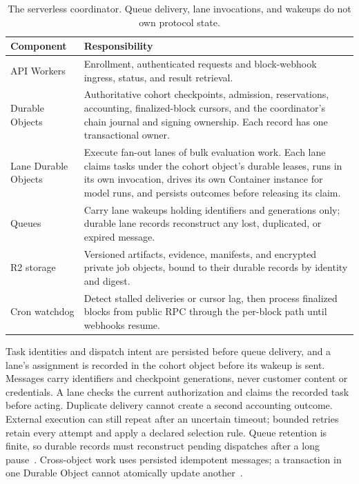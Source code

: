 \begin{table}[H]
\centering
\begin{tabularx}{\linewidth}{@{}lX@{}}
\toprule
Component & Responsibility \\
\midrule
API Workers & Enrollment, authenticated requests and block-webhook ingress,
status, and result retrieval. \\
Durable Objects & Authoritative cohort checkpoints, admission, reservations,
accounting, finalized-block cursors, and the coordinator's chain journal and
signing ownership. Each record has one transactional owner. \\
Lane Durable Objects & Execute fan-out lanes of bulk evaluation work. Each lane
claims tasks under the cohort object's durable leases, runs in its own
invocation, drives its own Container instance for model runs, and persists
outcomes before releasing its claim. \\
Queues & Carry lane wakeups holding identifiers and generations only; durable
lane records reconstruct any lost, duplicated, or expired message. \\
R2 storage & Versioned artifacts, evidence, manifests, and encrypted private
job objects, bound to their durable records by identity and digest. \\
Cron watchdog & Detect stalled deliveries or cursor lag, then process
finalized blocks from public RPC through the per-block path until webhooks
resume. \\
\bottomrule
\end{tabularx}
\caption{The serverless coordinator. Queue delivery, lane invocations, and
wakeups do not own protocol state.}
\end{table}

Task identities and dispatch intent are persisted before queue delivery, and a
lane's assignment is recorded in the cohort object before its wakeup is sent.
Messages carry identifiers and checkpoint generations, never customer content
or credentials. A lane checks the current authorization and claims the
recorded task before acting. Duplicate delivery cannot create a second
accounting outcome. External execution can still repeat after an uncertain
timeout; bounded retries retain every attempt and apply a declared selection
rule. Queue retention is finite, so durable records must reconstruct pending
dispatches after a long pause~\cite{cfqueues}. Cross-object work uses persisted
idempotent messages; a transaction in one Durable Object cannot atomically
update another~\cite{cfdo}.

